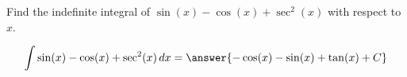 \documentclass{ximera}
\author{Gregory Hartman \and Matthew Carr}
\begin{document}
\begin{exercise}

Find the indefinite integral of $\sin(x)-\cos(x)+\sec^{2}(x)$ with respect to $x$.
\begin{prompt}
  \[
  \int \sin(x)-\cos(x)+\sec^{2}(x)\d x
  =\answer{-\cos(x)-\sin(x)+\tan(x)+C}
  \]
\end{prompt}
\end{exercise}
\end{document}
